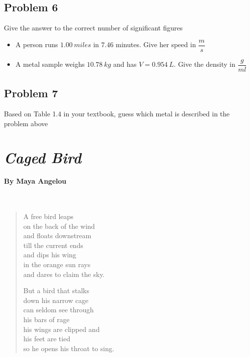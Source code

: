 \documentclass[11pt, letterpaper]{memoir}
\begin{document}
{

\vspace{3em}
\subsection*{Problem 6}
Give the answer to the correct number of significant figures
\begin{itemize}
	\item \vspace{2em} A person runs $1.00~miles$ in $7.46$ minutes. Give her speed in $\dfrac{m}{s}$
	\item \vspace{3em} A metal sample weighs $10.78~kg$ and has $V=0.954~L$. Give the density in $\dfrac{g}{ml}$
\end{itemize}

\vspace{3em}
\subsection*{Problem 7}
Based on Table 1.4 in your textbook, guess which metal is described in the problem above

\newpage
\pagestyle{empty}
\addtocounter{page}{-1}
\section*{\emph{Caged Bird}}
\paragraph{By Maya Angelou}~
\begin{verse}
	A free bird leaps\\
	on the back of the wind\\
	and floats downstream\\
	till the current ends\\
	and dips his wing\\
	in the orange sun rays\\
	and dares to claim the sky.

	But a bird that stalks\\
	down his narrow cage\\
	can seldom see through\\
	his bars of rage\\
	his wings are clipped and\\
	his feet are tied\\
	so he opens his throat to sing.


\end{verse}}
\end{document}
